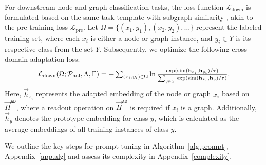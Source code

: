 For downstream node and graph classification tasks, the loss function \( \mathcal{L}_\text{down} \) is formulated based on the same task template with subgraph similarity \cite{liu2023graphprompt}, akin to the pre-training loss \( \mathcal{L}_\text{pre} \). Let \( \Omega = \{(x_1, y_1), (x_2, y_2), \ldots\} \) represent the labeled training set, where each \( x_i \) is either a node or graph instance, and \( y_i \in Y \) is its respective class from the set \( Y \). Subsequently, we optimize the following cross-domain adaptation loss:
\begin{align}\label{eq.downstream_loss}\textstyle
    \mathcal{L}_\text{down}(\Omega;\mathcal{P}_\text{hol},\Lambda,\Gamma)=-\sum_{(x_i,y_i)\in \Omega}\ln\frac{\exp(\text{sim}(\mathbf{h}_{x_i},{\mathbf{h}}_{y_i})/\tau )}{\sum_{y\in Y}\exp(\text{sim}(\mathbf{h}_{x_i},{\mathbf{h}}_{y})/\tau )}.
\end{align}
Here, $\vec{h}_{x_i}$ represents the adapted embedding of the node or graph $x_i$ based on $\vec{H}^\mathtt{AD}$, 
where a readout operation on $\vec{H}^\mathtt{AD}$ is required if $x_i$ is a graph. 
Additionally, ${\vec{h}}_y$ denotes the prototype embedding for class $y$, which is calculated as the average embeddings of all training instances of class $y$. %

We outline the key steps for prompt tuning in Algorithm~\ref{alg.prompt}, Appendix~\ref{app.alg} and assess its complexity in Appendix~\ref{complexity}.
